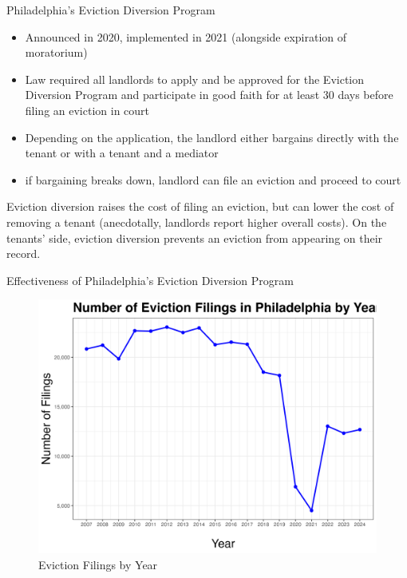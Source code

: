 \documentclass[10pt, xcolor=dvipsnames]{beamer}
\begin{document}
\begin{frame}{Philadelphia's Eviction Diversion Program}
    \begin{itemize}
        \item Announced in 2020, implemented in 2021 (alongside expiration of moratorium)
        \item Law required all landlords to apply and be approved for the Eviction Diversion Program and participate in good faith for at least 30 days before filing an eviction in court
        \item Depending on the application, the landlord either bargains directly with the tenant or with a tenant and a mediator
        \item if bargaining breaks down, landlord can file an eviction and proceed to court
    \end{itemize}

    Eviction diversion raises the cost of filing an eviction, but can lower the cost of removing a tenant (anecdotally, landlords report higher overall costs). On the tenants' side, eviction diversion prevents an eviction from appearing on their record.
\end{frame}

\begin{frame}{Effectiveness of Philadelphia's Eviction Diversion Program}
    \begin{figure}
        \centering
        \includegraphics[width=0.75\linewidth]{figs/num_eviction_filings_by_year.png}
        \caption{Eviction Filings by Year}
        \label{fig:evict-year}
    \end{figure}
\end{frame}
\end{document}
